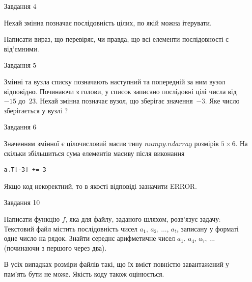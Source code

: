 \documentclass[12pt, ukrainian]{article}
\begin{document}
{\begin{minipage}[t]{8.0cm}
\end{minipage}


               
{\begin{center}Завдання {4}\end{center}}
\vspace{-4mm}
Нехай змінна  позначає послідовність цілих, по якій можна ітерувати.

Написати вираз, що перевіряє, чи правда, що всі елементи послідовності є від’ємни\-ми.\par

\vspace{10mm}
               
{\begin{center}Завдання {5}\end{center}}
\vspace{-4mm}
Змінні  та  вузла списку позначають наступний та попередній за ним вузол відповідно. Починаючи з голови, у список записано послідовні цілі числа від~$-15$ до~$23$. Нехай змінна  позначає вузол, що зберігає значення~$-3$.
Яке число зберігається у вузлі  ?\par

               
{\begin{center}Завдання {6}\end{center}}
\vspace{-4mm}
Значенням змінної  є цілочисловий масив типу $numpy.ndarray$ розмірів $5{\times}6$. На скільки збільшиться сума елементів масиву  після виконання
\begin{verbatim}
a.T[-3] += 3
\end{verbatim}


Якщо код некоректний, то в якості відповіді зазначити ERROR.\par

               
{\begin{center}Завдання {10}\end{center}}
\vspace{-4mm}

Написати функцію $f$, яка для файлу, заданого шляхом, розв’язує задачу:\\ Текстовий файл містить послідовність чисел $a_1$, $a_2$, $\ldots$, $a_t$, записану у форматі одне число на рядок. Знайти середнє арифметичне чисел $a_1$, $a_4$, $a_7$, $\ldots$ (починаючи з першого через два).

В усіх випадках розміри файлів такі, що їх вміст повністю завантажений у пам'ять бути не може. Якість коду також оцінюється.



}
\end{document}
